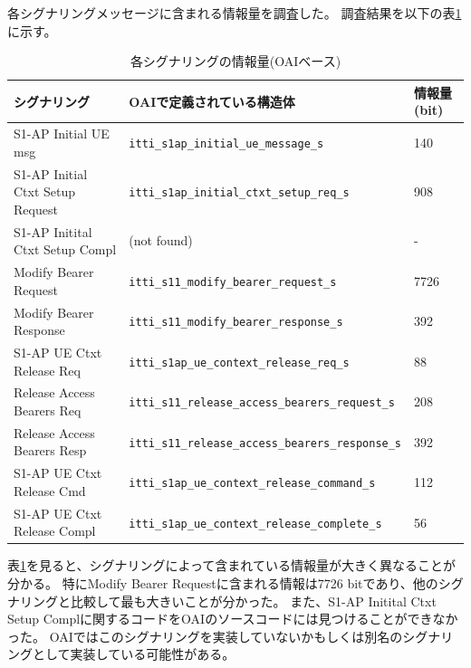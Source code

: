 \documentclass[a4j]{ujarticle}
\begin{document}
各シグナリングメッセージに含まれる情報量を調査した。
調査結果を以下の表\ref{table:oai_signal_memory}に示す。
\begin{table}[htbp]
  \centering
  \caption{各シグナリングの情報量(OAIベース)}
  \label{table:oai_signal_memory}
  \begin{tabular}{l|l|l}
    \hline
    シグナリング  & OAIで定義されている構造体 & 情報量(bit)  \\ \hline \hline
    S1-AP Initial UE msg  & \verb|itti_s1ap_initial_ue_message_s| & 140\\
    S1-AP Initial Ctxt Setup Request  & \verb|itti_s1ap_initial_ctxt_setup_req_s| & 908\\
    S1-AP Initital Ctxt Setup Compl & (not found)  &  -\\
    Modify Bearer Request & \verb|itti_s11_modify_bearer_request_s|  &  7726\\
    Modify Bearer Response  & \verb|itti_s11_modify_bearer_response_s| &  392\\
    S1-AP UE Ctxt Release Req & \verb|itti_s1ap_ue_context_release_req_s|  &  88\\
    Release Access Bearers Req  & \verb|itti_s11_release_access_bearers_request_s| &  208\\
    Release Access Bearers Resp & \verb|itti_s11_release_access_bearers_response_s| & 392\\
    S1-AP UE Ctxt Release Cmd  & \verb|itti_s1ap_ue_context_release_command_s| &  112\\
    S1-AP UE Ctxt Release Compl  & \verb|itti_s1ap_ue_context_release_complete_s|  &  56\\\hline
  \end{tabular}
\end{table}
表\ref{table:oai_signal_memory}を見ると、シグナリングによって含まれている情報量が大きく異なることが分かる。
特にModify Bearer Requestに含まれる情報は7726 bitであり、他のシグナリングと比較して最も大きいことが分かった。
また、S1-AP Initital Ctxt Setup Complに関するコードをOAIのソースコードには見つけることができなかった。
OAIではこのシグナリングを実装していないかもしくは別名のシグナリングとして実装している可能性がある。
\end{document}
